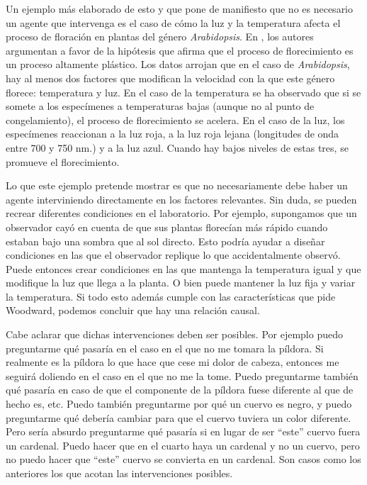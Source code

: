 Un ejemplo más elaborado de esto y que pone de manifiesto que no es necesario un agente que intervenga es el caso de cómo la luz y la temperatura afecta el proceso de floración en plantas del género \emph{Arabidopsis}. En \cite{AusinEnviro}, los autores argumentan a favor de la hipótesis que afirma que el proceso de florecimiento es un proceso altamente plástico. Los datos arrojan que en el caso de \emph{Arabidopsis}, hay al menos dos factores que modifican la velocidad con la que este género florece: temperatura y luz. En el caso de la temperatura se ha observado que si se somete a los especímenes a temperaturas bajas (aunque no al punto de congelamiento), el proceso de florecimiento se acelera. En el caso de la luz, los especímenes reaccionan a la luz roja, a la luz roja lejana (longitudes de onda entre 700 y 750 nm.) y a la luz azul. Cuando hay bajos niveles de estas tres, se promueve el florecimiento.

Lo que este ejemplo pretende mostrar es que no necesariamente debe haber un agente interviniendo directamente en los factores relevantes. Sin duda, se pueden recrear diferentes condiciones en el laboratorio. Por ejemplo, supongamos que un observador cayó en cuenta de que sus plantas florecían más rápido cuando estaban bajo una sombra que al sol directo. Esto podría ayudar a diseñar condiciones en las que el observador replique lo que accidentalmente observó. Puede entonces crear condiciones en las que mantenga la temperatura igual y que modifique la luz que llega a la planta. O bien puede mantener la luz fija y variar la temperatura. Si todo esto además cumple con las características que pide Woodward, podemos concluir que hay una relación causal.

Cabe aclarar que dichas intervenciones deben ser posibles. Por ejemplo puedo preguntarme qué pasaría en el caso en el que no me tomara la píldora. Si realmente es la píldora lo que hace que cese mi dolor de cabeza, entonces me seguirá doliendo en el caso en el que no me la tome. Puedo preguntarme también qué pasaría en caso de que el componente de la píldora fuese diferente al que de hecho es, etc. Puedo también preguntarme por qué un cuervo es negro, y puedo preguntarme qué debería cambiar para que el cuervo tuviera un color diferente. Pero sería absurdo preguntarme qué pasaría si en lugar de ser ``este'' cuervo fuera un cardenal. Puedo hacer que en el cuarto haya un cardenal y no un cuervo, pero no puedo hacer que ``este'' cuervo se convierta en un cardenal. Son casos como los anteriores los que acotan las intervenciones posibles.

